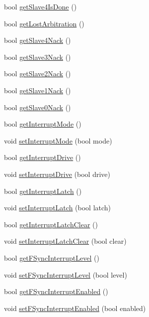 \begin{DoxyCompactItemize}
bool \hyperlink{classMPU6050_a105aefe645e7021f9ba4397e9df4114c}{get\+Slave4\+Is\+Done} ()
\item 
bool \hyperlink{classMPU6050_acd775c72f85dabfc6f8fba43da096c6d}{get\+Lost\+Arbitration} ()
\item 
bool \hyperlink{classMPU6050_ae9882b425cbdced4de325b608d896e10}{get\+Slave4\+Nack} ()
\item 
bool \hyperlink{classMPU6050_a55f24d2f2b13d6e28a7c8b6bf2913520}{get\+Slave3\+Nack} ()
\item 
bool \hyperlink{classMPU6050_af4b5101dab501d6df2e0cae909120771}{get\+Slave2\+Nack} ()
\item 
bool \hyperlink{classMPU6050_a65cc9d75ff347b146414685fb83fa451}{get\+Slave1\+Nack} ()
\item 
bool \hyperlink{classMPU6050_a74511edfcada3fb21c3327a0c846c72a}{get\+Slave0\+Nack} ()
\item 
bool \hyperlink{classMPU6050_a58da1dfb39eb34e3a09a9b0bf4d87f29}{get\+Interrupt\+Mode} ()
\item 
void \hyperlink{classMPU6050_a003a098a1521c5ef4df50c0a8a2d47ab}{set\+Interrupt\+Mode} (bool mode)
\item 
bool \hyperlink{classMPU6050_af66e6c7b1885dcf452e73371790fddfd}{get\+Interrupt\+Drive} ()
\item 
void \hyperlink{classMPU6050_a9d9d6aeea346e6f6fad8e4a428cf3301}{set\+Interrupt\+Drive} (bool drive)
\item 
bool \hyperlink{classMPU6050_a5502c4c2a9bc4ea9267e128b7743923d}{get\+Interrupt\+Latch} ()
\item 
void \hyperlink{classMPU6050_abf9ccf9eb6c7156e6660abb76734920a}{set\+Interrupt\+Latch} (bool latch)
\item 
bool \hyperlink{classMPU6050_a9a098a607e20c64b60e155da35b8264f}{get\+Interrupt\+Latch\+Clear} ()
\item 
void \hyperlink{classMPU6050_a2fa64c7030242aac18bd6727e8ca4a54}{set\+Interrupt\+Latch\+Clear} (bool clear)
\item 
bool \hyperlink{classMPU6050_a60fc85d4f27f99d07ffb9543d5e5f347}{get\+F\+Sync\+Interrupt\+Level} ()
\item 
void \hyperlink{classMPU6050_a2b1c75cfc29e8ff8205f4ff33a426716}{set\+F\+Sync\+Interrupt\+Level} (bool level)
\item 
bool \hyperlink{classMPU6050_a4c01f9ab83b64dbbc6b62e658c3d3d9b}{get\+F\+Sync\+Interrupt\+Enabled} ()
\item 
void \hyperlink{classMPU6050_a96aa409e02cdb7d3671890c70b44f167}{set\+F\+Sync\+Interrupt\+Enabled} (bool enabled)

\end{DoxyCompactItemize}
